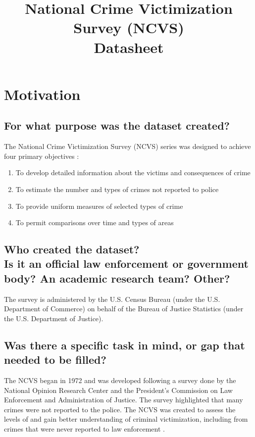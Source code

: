 \documentclass[letterpaper, 10 pt, conference]{ieeeconf}  %
\title{\LARGE \bf
National Crime Victimization Survey (NCVS) \\{\color{blue}Datasheet}
}
\newcommand{\subtitle}[1]{{\\ \small \normalfont \color{purple} #1}}
\begin{document}
\maketitle
\thispagestyle{empty}
\pagestyle{empty}

\section{Motivation}

\subsection{For what purpose was the dataset created?}

The National Crime Victimization Survey (NCVS) series was designed to achieve four primary objectives \cite{ncvs_data_coodbook}:
\begin{enumerate}
    \item To develop detailed information about the victims and consequences of crime
    \item To estimate the number and types of crimes not reported to police
    \item To provide uniform measures of selected types of crime
    \item To permit comparisons over time and types of areas
\end{enumerate} 

\subsection{Who created the dataset? \subtitle{Is it an official law enforcement or government body? An academic research team? Other?}}

The survey is administered by the U.S. Census Bureau (under the U.S. Department of Commerce) on behalf of the Bureau of Justice Statistics (under the U.S. Department of Justice). 

\subsection{Was there a specific task in mind, or gap that needed to be filled?}

The NCVS began in 1972 and was developed following a survey done by the National Opinion Research Center and the President's Commission on Law Enforcement and Administration of Justice. The survey highlighted that many crimes were not reported to the police. The NCVS was created to assess the levels of and gain better understanding  of criminal victimization, including from crimes that were never reported to law enforcement \cite{ncvs_data_coodbook}.
\end{document}
